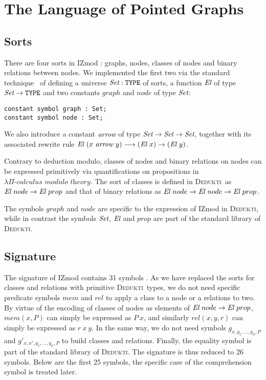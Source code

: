 \documentclass[submission,copyright,creativecommons]{eptcs}
\def\Type{\mbox{\tt TYPE}}
\def\ra{\rightarrow}
\def\lra{\longrightarrow}
\def\Set{\mbox{\it Set}}
\def\El{{\mbox{\it El}}}
\newcommand{\dedukti}{\textsc{Dedukti}}
\newcommand{\lpcm}{$\lambda \Pi\textit{-calculus modulo theory}$}
\def\arr{{\mbox{\it arrow}}}
\begin{document}
\section{The Language of Pointed Graphs}

\subsection{Sorts}

There are four sorts in IZmod \cite[see Section 3.2]{zermodulo}: graphs, nodes, classes of nodes and binary relations between nodes. We implemented the first two via the standard technique~\cite{theoryU} of defining a universe $\Set:\Type$ of sorts, a function $\El$ of type $\Set \ra \Type$ and two constants $graph$ and $node$ of type $\Set$:
\begin{lstlisting}
constant symbol graph : Set;
constant symbol node : Set;
\end{lstlisting}
We also introduce a constant $\arr $ of type $\Set \ra \Set \ra \Set$, together with its associated rewrite rule $\El~(x~\arr~y) \lra (\El~x) \ra (\El~y)$.

Contrary to deduction modulo, classes of nodes and binary relations on nodes can be expressed primitively via quantifications on propositions in \lpcm. The sort of classes is defined in \dedukti ~as $\El~node \ra \El~prop$ and that of binary relations as $\El~node \ra \El~node \ra \El~prop$.

The symbols $graph$ and $node$ are specific to the expression of IZmod in \dedukti, while in contrast the symbols $\Set$, $\El$ and $prop$ are part of the standard library of \dedukti.

\subsection{Signature}

The signature of IZmod contains 31 symbols \cite[see Table 2]{zermodulo}. As we have replaced the sorts for classes and relations with primitive \dedukti ~types, we do not need specific predicate symbols $mem$ and $rel$ to apply a class to a node or a relations to two. By virtue of the encoding of classes of nodes as elements of $\El~node \ra \El~prop$, $mem(x,P)$ can simply be expressed as $P~x$, and similarly $rel(x,y,r)$ can simply be expressed as $r~x~y$. In the same way, we do not need symbols $g_{x,y_1,...,y_n,P}$ and $g'_{x,x',y_1,...,y_n,P}$ to build classes and relations. Finally, the equality symbol is part of the standard library of \dedukti. The signature is thus reduced to 26 symbols. Below are the first 25 symbols, the specific case of the comprehension symbol is treated later.
\end{document}
